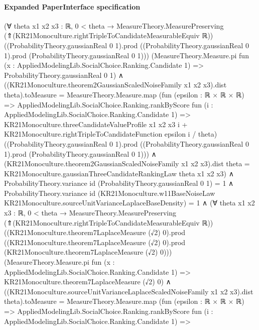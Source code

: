 \documentclass[10pt]{article}
\begin{document}
\paragraph{Expanded PaperInterface specification}
\begin{ReviewVerbatim}
(∀ {theta x1 x2 x3 : ℝ},
    0 < theta →
      MeasureTheory.MeasurePreserving (⇑(KR21Monoculture.rightTripleToCandidateMeasurableEquiv ℝ))
          ((ProbabilityTheory.gaussianReal 0 1).prod
            ((ProbabilityTheory.gaussianReal 0 1).prod (ProbabilityTheory.gaussianReal 0 1)))
          (MeasureTheory.Measure.pi fun (x : AppliedModelingLib.SocialChoice.Ranking.Candidate 1) =>
            ProbabilityTheory.gaussianReal 0 1) ∧
        ((KR21Monoculture.theorem2GaussianScaledNoiseFamily x1 x2 x3).dist theta).toMeasure =
            MeasureTheory.Measure.map
              (fun (epsilon : ℝ × ℝ × ℝ) =>
                AppliedModelingLib.SocialChoice.Ranking.rankByScore
                  fun (i : AppliedModelingLib.SocialChoice.Ranking.Candidate 1) =>
                  KR21Monoculture.threeCandidateValueProfile x1 x2 x3 i +
                    KR21Monoculture.rightTripleToCandidateFunction epsilon i / theta)
              ((ProbabilityTheory.gaussianReal 0 1).prod
                ((ProbabilityTheory.gaussianReal 0 1).prod (ProbabilityTheory.gaussianReal 0 1))) ∧
          (KR21Monoculture.theorem2GaussianScaledNoiseFamily x1 x2 x3).dist theta =
            KR21Monoculture.gaussianThreeCandidateRankingLaw theta x1 x2 x3) ∧
  ProbabilityTheory.variance id (ProbabilityTheory.gaussianReal 0 1) = 1 ∧
    ProbabilityTheory.variance id
          (KR21Monoculture.w11BaseNoiseLaw KR21Monoculture.sourceUnitVarianceLaplaceBaseDensity) =
        1 ∧
      (∀ {theta x1 x2 x3 : ℝ},
          0 < theta →
            MeasureTheory.MeasurePreserving (⇑(KR21Monoculture.rightTripleToCandidateMeasurableEquiv ℝ))
                ((KR21Monoculture.theorem7LaplaceMeasure (√2) 0).prod
                  ((KR21Monoculture.theorem7LaplaceMeasure (√2) 0).prod
                    (KR21Monoculture.theorem7LaplaceMeasure (√2) 0)))
                (MeasureTheory.Measure.pi fun (x : AppliedModelingLib.SocialChoice.Ranking.Candidate 1) =>
                  KR21Monoculture.theorem7LaplaceMeasure (√2) 0) ∧
              ((KR21Monoculture.sourceUnitVarianceLaplaceScaledNoiseFamily x1 x2 x3).dist theta).toMeasure =
                  MeasureTheory.Measure.map
                    (fun (epsilon : ℝ × ℝ × ℝ) =>
                      AppliedModelingLib.SocialChoice.Ranking.rankByScore
                        fun (i : AppliedModelingLib.SocialChoice.Ranking.Candidate 1) =>

\end{ReviewVerbatim}
\end{document}
